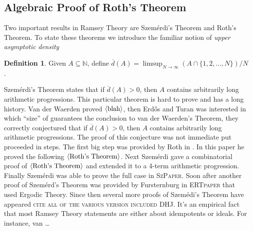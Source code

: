 \documentclass[12pt]{article}
\theoremstyle{plain}
\theoremstyle{definition}
\newtheorem{defn}[thm]{Definition}
\newcommand{\bbN}{\mathbb{N}}
\newcommand{\la}{\langle}
\newcommand{\ra}{\rangle}
\begin{document}
\subsection{Algebraic Proof of Roth's Theorem}
Two important results in Ramsey Theory are Szem\'{e}rdi's Theorem and
Roth's Theorem. 
To state these theorems we introduce the familiar notion of \textsl{upper
asymptotic density}
  \begin{defn}
    Given $A \subseteq \bbN$, define $\overline{d}(A) = \limsup_{N \to
      \infty} (A \cap \{1, 2, \ldots, N\})/ N$.
  \end{defn}
Szem\'{e}rdi's Theorem states that if $\overline{d}(A) > 0$, then $A$
contains arbitrarily long arithmetic progressions. 
This particular theorem is hard to prove and has a long history. 
Van der Waerden proved $\la\hbox{blah}\ra$, then Erd\H{o}s and Turan
was interested in which ``size'' of guarantees the conclusion to van
der Waerden's Theorem, they correctly conjectured that if
$\overline{d}(A) >0$, then $A$ contains arbitrarily long arithmetic
progressions. 
The proof of this conjecture was not immediate put proceeded in
steps. 
The first big step was provided by Roth in \cite{Roth:1953fk}. 
In this paper he proved the following $\la\hbox{Roth's Theorem}\ra$.
Next Szem\'{e}rdi gave a combinatorial proof of $\la\hbox{Roth's
  Theorem}\ra$ and extended it to a 4-term arithmetic progression. 
Finally Szem\'{e}rdi was able to prove the full case in
\textsc{SzPaper}. 
Soon after another proof of Szem\'{e}rd's Theorem was provided by
Fursternburg in \textsc{ERTpaper} that used Ergodic Theory. 
Since then several more proofs of Szem\'{e}di's Theorem have appeared
\textsc{cite all of the various version included DHJ}. 
It's an empirical fact that most Ramsey Theory statements are either
about idempotents or ideals.
For instance, van \dots




\end{document}
